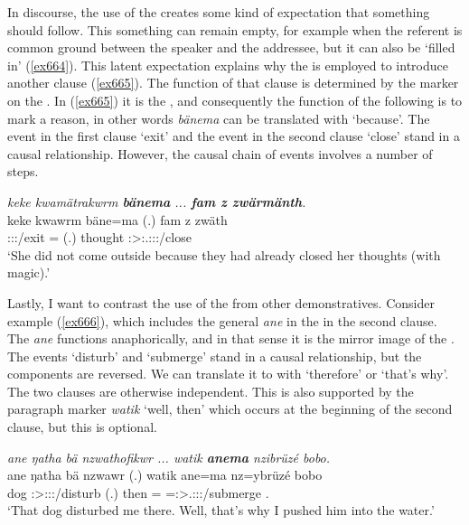 In discourse, the use of the  creates some kind of expectation that something should follow. This something can remain empty, for example when the referent is common ground between the speaker and the addressee, but it can also be `filled in' (\ref{ex664}). This latent expectation explains why the  is employed to introduce another clause (\ref{ex665}). The function of that clause is determined by the  marker on the . In (\ref{ex665}) it is the  , and consequently the function of the following  is to mark a reason, in other words \emph{bänema} can be translated with `because'. The event in the first clause `exit' and the event in the second clause `close' stand in a causal relationship. However, the causal chain of events involves a number of steps.

\begin{exe}
	\ex \emph{keke kwamätrakwrm \textbf{bänema} ... \textbf{fam z zwärmänth}.}\\
	\gll keke kwawrm bäne=ma (.) fam z zwäth\\
	{\Neg} \Sg:\Sbj:\Pst:\Dur/exit \Recog={\Char} (.) thought {\Iam} \Stsg:\Sbj>\Tsg:.\F:\Obj:\Rpst:\Pfv/close\\
	\trans `She did not come outside because they had already closed her thoughts (with magic).'
	\label{ex665}
\end{exe}

Lastly, I want to contrast the use of the  from other demonstratives. Consider example (\ref{ex666}), which includes the general  \emph{ane} in the   in the second clause. The  \emph{ane} functions anaphorically, and in that sense it is the mirror image of the . The events `disturb' and `submerge' stand in a causal relationship, but the components are reversed. We can translate it to  with `therefore' or `that's why'. The two clauses are otherwise independent. This is also supported by the paragraph marker \emph{watik} `well, then' which occurs at the beginning of the second clause, but this is optional.

\begin{exe}
	\ex \emph{ane ŋatha bä nzwathofikwr ... watik \textbf{anema} nzibrüzé bobo.}\\
	\gll ane ŋatha bä nzwawr (.) watik ane=ma nz=ybrüzé bobo\\
	{\Dem} dog \Med{} \Stsg:\Sbj>\Fsg:\Obj:\Rpst:\Ipfv/disturb (.) then \Dem={\Char} \Immpst=\Fsg:\Sbj>\Stsg.\Masc:\Obj:\Nonpast:\Ipfv/submerge \Med.{\All}\\
	\trans `That dog disturbed me there. Well, that's why I pushed him into the water.'\\
	\label{ex666}
\end{exe}

